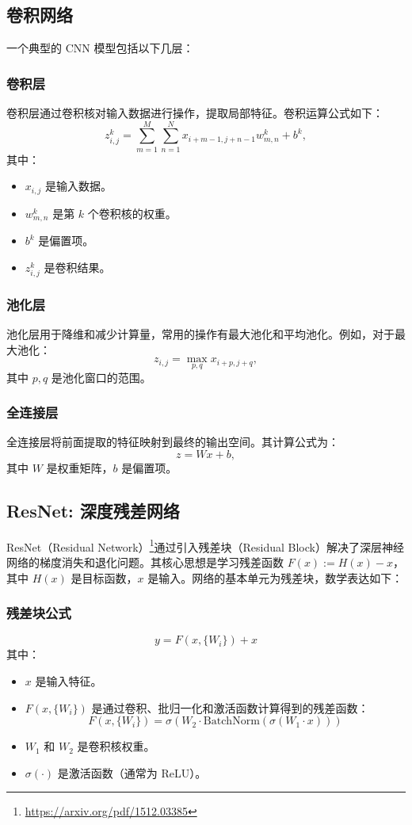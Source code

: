 \documentclass[12pt, a4paper, oneside]{ctexart}
\numberwithin{equation}{section}  %
\begin{document}
\subsection{卷积网络}
一个典型的 CNN 模型包括以下几层：

\subsubsection{卷积层}
卷积层通过卷积核对输入数据进行操作，提取局部特征。卷积运算公式如下：
\[
z_{i,j}^k = \sum_{m=1}^{M} \sum_{n=1}^{N} x_{i+m-1,j+n-1} w_{m,n}^k + b^k,
\]
其中：
\begin{itemize}
    \item $x_{i,j}$ 是输入数据。
    \item $w_{m,n}^k$ 是第 $k$ 个卷积核的权重。
    \item $b^k$ 是偏置项。
    \item $z_{i,j}^k$ 是卷积结果。
\end{itemize}

\subsubsection{池化层}
池化层用于降维和减少计算量，常用的操作有最大池化和平均池化。例如，对于最大池化：
\[
z_{i,j} = \max_{p,q} x_{i+p,j+q},
\]
其中 $p,q$ 是池化窗口的范围。

\subsubsection{全连接层}
全连接层将前面提取的特征映射到最终的输出空间。其计算公式为：
\[
z = Wx + b,
\]
其中 $W$ 是权重矩阵，$b$ 是偏置项。

\subsection{ResNet: 深度残差网络}

ResNet（Residual Network）\footnote{\url{https://arxiv.org/pdf/1512.03385}}通过引入残差块（Residual Block）解决了深层神经网络的梯度消失和退化问题。其核心思想是学习残差函数 $F(x) := H(x) - x$，其中 $H(x)$ 是目标函数，$x$ 是输入。网络的基本单元为残差块，数学表达如下：

\subsubsection{残差块公式}
\[
y = F(x, \{W_i\}) + x
\]
其中：
\begin{itemize}
    \item $x$ 是输入特征。
    \item $F(x, \{W_i\})$ 是通过卷积、批归一化和激活函数计算得到的残差函数：
    \[
    F(x, \{W_i\}) = \sigma(W_2 \cdot \text{BatchNorm}(\sigma(W_1 \cdot x)))
    \]
    \item $W_1$ 和 $W_2$ 是卷积核权重。
    \item $\sigma(\cdot)$ 是激活函数（通常为 ReLU）。
\end{itemize}
\end{document}
